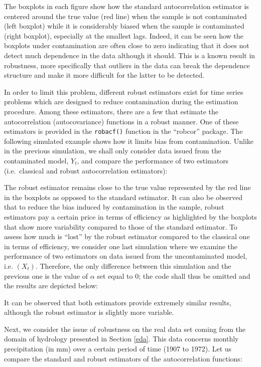 \documentclass[]{book}
\theoremstyle{definition}
\theoremstyle{definition}
\theoremstyle{definition}
\theoremstyle{remark}
\begin{document}
{The boxplots in each figure show how the standard autocorrelation
estimator is centered around the true value (red line) when the sample
is not contaminated (left boxplot) while it is considerably biased when
the sample is contaminated (right boxplot), especially at the smallest
lags. Indeed, it can be seen how the boxplots under contamination are
often close to zero indicating that it does not detect much dependence
in the data although it should. This is a known result in robustness,
more specifically that outliers in the data can break the dependence
structure and make it more difficult for the latter to be detected.

In order to limit this problem, different robust estimators exist for
time series problems which are designed to reduce contamination during
the estimation procedure. Among these estimators, there are a few that
estimate the autocorrelation (autocovariance) functions in a robust
manner. One of these estimators is provided in the \texttt{robacf()}
function in the ``robcor'' package. The following simulated example
shows how it limits bias from contamination. Unlike in the previous
simulation, we shall only consider data issued from the contaminated
model, \(Y_t\), and compare the performance of two estimators
(i.e.~classical and robust autocorrelation estimators):

The robust estimator remains close to the true value represented by the
red line in the boxplots as opposed to the standard estimator. It can
also be observed that to reduce the bias induced by contamination in the
sample, robust estimators pay a certain price in terms of efficiency as
highlighted by the boxplots that show more variability compared to those
of the standard estimator. To assess how much is ``lost'' by the robust
estimator compared to the classical one in terms of efficiency, we
consider one last simulation where we examine the performance of two
estimators on data issued from the uncontaminated model, i.e. \((X_t)\).
Therefore, the only difference between this simulation and the previous
one is the value of \(\alpha\) set equal to \(0\); the code shall thus
be omitted and the results are depicted below:

It can be observed that both estimators provide extremely similar
results, although the robust estimator is slightly more variable.

Next, we consider the issue of robustness on the real data set coming
from the domain of hydrology presented in Section \ref{eda}. This data
concerns monthly precipitation (in mm) over a certain period of time
(1907 to 1972). Let us compare the standard and robust estimators of the
autocorrelation functions:

}
\end{document}
